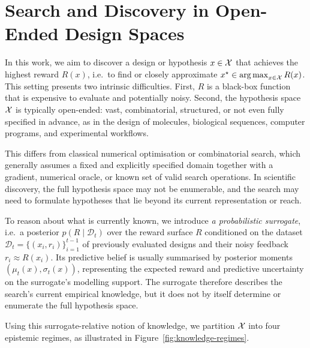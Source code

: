 \section{Search and Discovery in Open-Ended Design Spaces}
\label{sec:ldm}

In this work, we aim to discover a design or hypothesis $x\in\mathcal{X}$ that achieves the highest
reward $R(x)$, i.e.\ to find or closely approximate
$x^\star\in\operatorname*{arg\,max}_{x\in\mathcal{X}}R(x)$. This setting presents two intrinsic
difficulties. First, $R$ is a black-box function that is expensive to evaluate
and potentially noisy. Second, the hypothesis space $\mathcal{X}$ is typically open-ended: vast,
combinatorial, structured, or not even fully specified in advance, as in the
design of molecules, biological sequences, computer programs, and experimental
workflows.

This differs from classical numerical optimisation or combinatorial search,
which generally assumes a fixed and explicitly specified domain together with
a gradient, numerical oracle, or known set of valid search operations. In
scientific discovery, the full hypothesis space may not be enumerable, and the
search may need to formulate hypotheses that lie beyond its current
representation or reach.

To reason about what is currently known, we introduce
\emph{a probabilistic surrogate}, i.e.\ a posterior
$p(R\mid\mathcal{D}_t)$ over the reward surface $R$ conditioned on the dataset
$\mathcal{D}_t=\{(x_i,r_i)\}_{i=1}^{t-1}$ of previously evaluated designs and
their noisy feedback $r_i\approx R(x_i)$. Its predictive belief is usually
summarised by posterior moments $(\mu_t(x),\sigma_t(x))$, representing the
expected reward and predictive uncertainty on the surrogate's modelling
support. The surrogate therefore describes the search's current empirical
knowledge, but it does not by itself determine or enumerate the full
hypothesis space.

Using this surrogate-relative notion of knowledge, we partition $\mathcal{X}$ into four
epistemic regimes, as illustrated in
Figure~\ref{fig:knowledge-regimes}.

